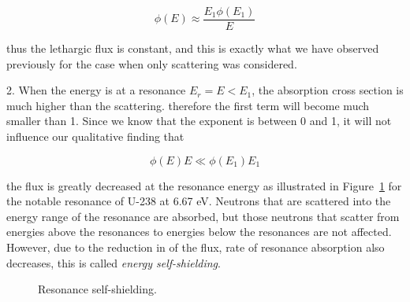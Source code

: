 $$\phi(E) \approx \frac{E_1\phi(E_1)}{E}$$

\noindent thus the lethargic flux is constant, and this is exactly what we have observed previously for the case when only scattering was considered.

2. When the energy is at a resonance $E_r=E<E_1$, the absorption cross section is much higher than the scattering. therefore the first term will become much smaller than 1. Since we know that the exponent is between 0 and 1, it will not influence our qualitative finding that 

$$\phi(E)E \ll \phi(E_1)E_1$$

\noindent the flux is greatly decreased at the resonance energy as illustrated in Figure~\ref{fig:selfshielding} for the notable resonance of U-238 at 6.67 eV. Neutrons that are scattered into the energy range of the resonance are absorbed, but those neutrons that scatter from energies above the resonances to energies below the resonances are not affected. However, due to the reduction in of the flux, rate of resonance absorption also decreases, this is called \textit{energy self-shielding}.

\begin{figure}[ht!]
\protect {}\protect
\caption{\label{fig:selfshielding} \footnotesize{Resonance self-shielding.}}
\end{figure}
 
